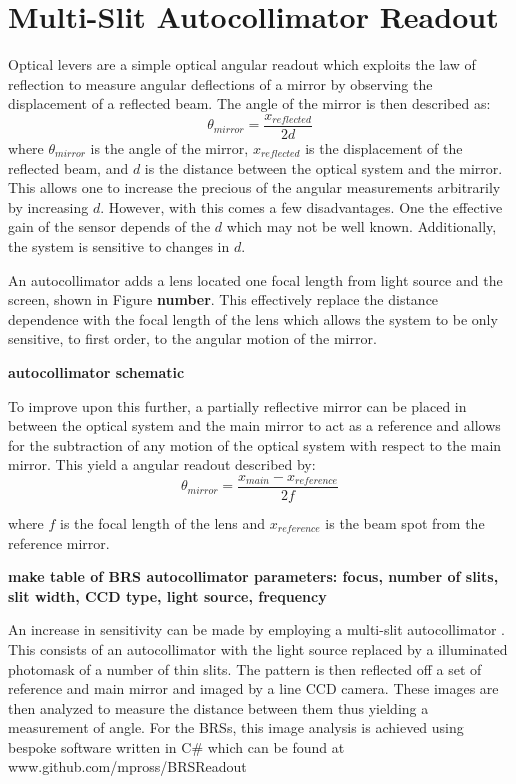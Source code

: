 \documentclass [12pt, proquest]{uwthesis}[2019]
\begin{document}
\section{Multi-Slit Autocollimator Readout}

\quad Optical levers are a simple optical angular readout which exploits the law of reflection to measure angular deflections of a mirror by observing the displacement of a reflected beam. The angle of the mirror is then described as:
\[\theta_{mirror}=\frac{x_{reflected}}{2d}\]
where $\theta_{mirror}$ is the angle of the mirror, $x_{reflected}$ is the displacement of the reflected beam, and $d$ is the distance between the optical system and the mirror. This allows one to increase the precious of the angular measurements arbitrarily by increasing $d$. However, with this comes a few disadvantages. One the effective gain of the sensor depends of the $d$ which may not be well known. Additionally, the system is sensitive to changes in $d$. 

An autocollimator adds a lens located one focal length from light source and the screen, shown in Figure \textbf{number}. This effectively replace the distance dependence with the focal length of the lens which allows the system to be only sensitive, to first order, to the angular motion of the mirror.

\textbf{autocollimator schematic}

To improve upon this further, a partially reflective mirror can be placed in between the optical system and the main mirror to act as a reference and allows for the subtraction of any motion of the optical system with respect to the main mirror. This yield a angular readout described by:
\[\theta_{mirror}=\frac{x_{main}-x_{reference}}{2f}\]

where $f$ is the focal length of the lens and $x_{reference}$ is the beam spot from the reference mirror.

\textbf{make table of BRS autocollimator parameters: focus, number of slits, slit width, CCD type, light source, frequency}

An increase in sensitivity can be made by employing a multi-slit autocollimator \cite{MSA}. This consists of an autocollimator with the light source replaced by a illuminated photomask of a number of thin slits. The pattern is then reflected off a set of reference and main mirror and imaged by a line CCD camera. These images are then analyzed to measure the distance between them thus yielding a measurement of angle. For the BRSs, this image analysis is achieved using bespoke software written in C\# which can be found at www.github.com/mpross/BRSReadout
\end{document}
